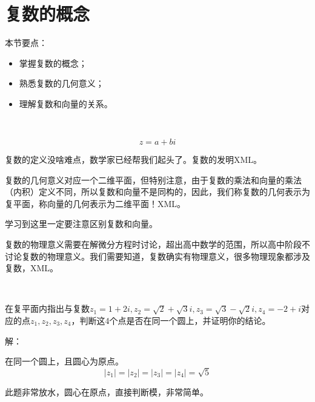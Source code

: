 \section{复数的概念}

本节要点：
\begin{itemize}
    \item 掌握复数的概念；
    \item 熟悉复数的几何意义；
    \item 理解复数和向量的关系。
\end{itemize}

~

\[
z=a+bi
\]

复数的定义没啥难点，数学家已经帮我们起头了。复数的发明XML。

复数的几何意义对应一个二维平面，但特别注意，由于复数的乘法和向量的乘法（内积）定义不同，所以复数和向量不是同构的，因此，我们称复数的几何表示为复平面，称向量的几何表示为二维平面！XML。

学习到这里一定要注意区别复数和向量。

\begin{tcolorbox}
复数的物理意义需要在解微分方程时讨论，超出高中数学的范围，所以高中阶段不讨论复数的物理意义。我们需要知道，复数确实有物理意义，很多物理现象都涉及复数，XML。
\end{tcolorbox}

~

\begin{example}
在复平面内指出与复数$z_1=1+2i,z_2=\sqrt{2}+\sqrt{3}i,z_3=\sqrt{3}-\sqrt{2}i,z_4=-2+i$对应的点$z_1,z_2,z_3,z_4$，判断这4个点是否在同一个圆上，并证明你的结论。
\end{example}

解：

在同一个圆上，且圆心为原点。
\[
\left| z_1 \right|=\left| z_2 \right|=\left| z_3 \right|=\left| z_4 \right|=\sqrt{5}
\]

\begin{tcolorbox}
此题非常放水，圆心在原点，直接判断模，非常简单。
\end{tcolorbox}




